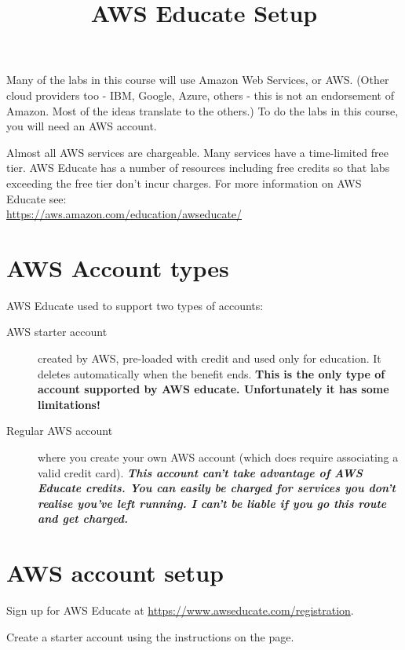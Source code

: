 \documentclass{pgnotes}
\title{AWS Educate Setup}
\begin{document}
\maketitle

Many of the labs in this course will use Amazon Web Services, or AWS.
(Other cloud providers too - IBM, Google, Azure, others - this is not an endorsement of Amazon.
Most of the ideas translate to the others.)
To do the labs in this course, you will need an AWS account.

Almost all AWS services are chargeable.
Many services have a time-limited free tier.
AWS Educate has a number of resources including free credits so that labs exceeding the free tier don't incur charges.
For more information on AWS Educate see:\\
\url{https://aws.amazon.com/education/awseducate/}

\section{AWS Account types}
\label{sec:aws-account-types}

AWS Educate used to support two types of accounts:

\begin{description}
\item[AWS starter account] created by AWS, pre-loaded with credit and used only for education. It deletes automatically when the benefit ends.
  \textbf{This is the only type of account supported by AWS educate.
    Unfortunately it has some limitations!}
  
\item[Regular AWS account] where you create your own AWS account (which does require associating a valid credit card).
  \textbf{
    \textit{
      This account can't take advantage of AWS Educate credits.
      You can easily be charged for services you don't realise you've left running.
      I can't be liable if you go this route and get charged.
    }
  }
\end{description}
 
\section{AWS account setup}
\label{sec:aws-account-setup}

Sign up for AWS Educate at
\url{https://www.awseducate.com/registration}.

Create a starter account using the instructions on the page.
\end{document}
